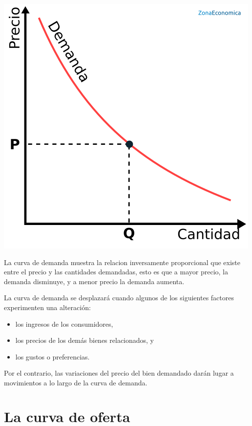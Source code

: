 \documentclass[12pt]{book}
\begin{document}
\begin {center}
\includegraphics[scale=.7]{demanda_0.png}
\\
\begin{scriptsize}
La curva de demanda muestra la relacion inversamente proporcional que existe entre el precio y las cantidades demandadas, esto es que a mayor precio, la demanda disminuye, y a menor precio la demanda aumenta.

\end{scriptsize}\end{center}

La curva de demanda se desplazará cuando algunos de los siguientes factores experimenten una alteración:
\begin{itemize}
\item los ingresos de los consumidores,
\item los precios de los demás bienes relacionados, y
\item los gustos o preferencias.
\end{itemize}
Por el contrario, las variaciones del precio del bien demandado darán lugar a movimientos a lo largo de la curva de demanda.

\section{La curva de oferta}
\end{document}
